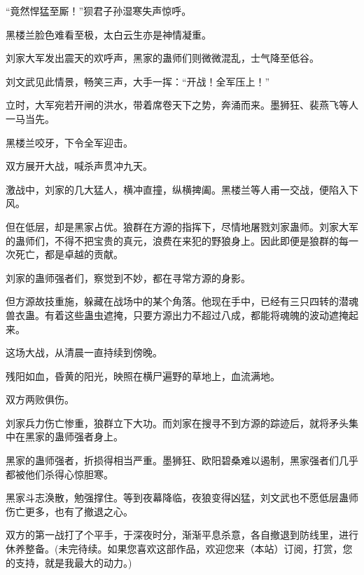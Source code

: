 \begin{this_body}
“竟然悍猛至厮！”狈君子孙湿寒失声惊呼。

黑楼兰脸色难看至极，太白云生亦是神情凝重。

刘家大军发出震天的欢呼声，黑家的蛊师们则微微混乱，士气降至低谷。

刘文武见此情景，畅笑三声，大手一挥：“开战！全军压上！”

立时，大军宛若开闸的洪水，带着席卷天下之势，奔涌而来。墨狮狂、裴燕飞等人一马当先。

黑楼兰咬牙，下令全军迎击。

双方展开大战，喊杀声贯冲九天。

激战中，刘家的几大猛人，横冲直撞，纵横捭阖。黑楼兰等人甫一交战，便陷入下风。

但在低层，却是黑家占优。狼群在方源的指挥下，尽情地屠戮刘家蛊师。刘家大军的蛊师们，不得不把宝贵的真元，浪费在来犯的野狼身上。因此即便是狼群的每一次死亡，都是卓越的贡献。

刘家的蛊师强者们，察觉到不妙，都在寻常方源的身影。

但方源故技重施，躲藏在战场中的某个角落。他现在手中，已经有三只四转的潜魂兽衣蛊。有着这些蛊虫遮掩，只要方源出力不超过八成，都能将魂魄的波动遮掩起来。

这场大战，从清晨一直持续到傍晚。

残阳如血，昏黄的阳光，映照在横尸遍野的草地上，血流满地。

双方两败俱伤。

刘家兵力伤亡惨重，狼群立下大功。而刘家在搜寻不到方源的踪迹后，就将矛头集中在黑家的蛊师强者身上。

黑家的蛊师强者，折损得相当严重。墨狮狂、欧阳碧桑难以遏制，黑家强者们几乎都被他们杀得心惊胆寒。

黑家斗志涣散，勉强撑住。等到夜幕降临，夜狼变得凶猛，刘文武也不愿低层蛊师伤亡更多，也有了撤退之心。

双方的第一战打了个平手，于深夜时分，渐渐平息杀意，各自撤退到防线里，进行休养整备。(未完待续。如果您喜欢这部作品，欢迎您来（本站）订阅，打赏，您的支持，就是我最大的动力。)

\end{this_body}

